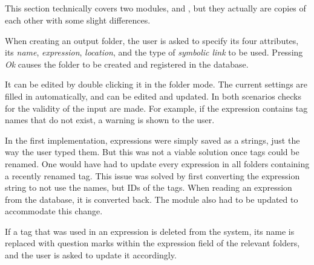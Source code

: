 \subsection{}
\def\kapitelautor{Erik Ritschl}

This section technically covers two modules,  and , but they actually are copies of each other with some slight differences. 

When creating an output folder, the user is asked to specify its four attributes, its \emph{name}, \emph{expression}, \emph{location}, and the type of \emph{symbolic link} to be used. Pressing \emph{Ok} causes the folder to be created and registered in the database.

It can be edited by double clicking it in the folder mode. The current settings are filled in automatically, and can be edited and updated. In both scenarios checks for the validity of the input are made. For example, if the expression contains tag names that do not exist, a warning is shown to the user. 

In the first implementation, expressions were simply saved as a strings, just the way the user typed them. But this was not a viable solution once tags could be renamed. One would have had to update every expression in all folders containing a recently renamed tag. This issue was solved by first converting the expression string to not use the names, but IDs of the tags. When reading an expression from the database, it is converted back. The  module also had to be updated to accommodate this change. 

If a tag that was used in an expression is deleted from the system, its name is replaced with question marks within the expression field of the relevant folders, and the user is asked to update it accordingly.